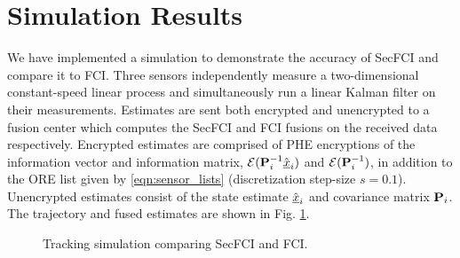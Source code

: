 \documentclass[letterpaper, 10 pt, conference]{ieeeconf}  %
\begin{document}



\section{Simulation Results} \label{sec:results}
We have implemented a simulation to demonstrate the accuracy of SecFCI and compare it to FCI. Three sensors independently measure a two-dimensional constant-speed linear process and simultaneously run a linear Kalman filter on their measurements. Estimates are sent both encrypted and unencrypted to a fusion center which computes the SecFCI and FCI fusions on the received data respectively. Encrypted estimates are comprised of PHE encryptions of the information vector and information matrix, $\mathcal{E}({{\mathbf{P}}}^{-1}_i\hat{{\underline{x}}}_i)$ and $\mathcal{E}({{\mathbf{P}}}^{-1}_i)$, in addition to the ORE list given by \eqref{eqn:sensor_lists} (discretization step-size $s=0.1$). Unencrypted estimates consist of the state estimate $\hat{{\underline{x}}}_i$ and covariance matrix ${{\mathbf{P}}}_i$. The trajectory and fused estimates are shown in Fig. \ref{fig:fci_secfci_traj}.
\begin{figure}[tb]
   \vspace{-5pt}
   \begin{center}
      
   \end{center}
   \vspace{-10pt}
   \caption{Tracking simulation comparing SecFCI and FCI.}
   \label{fig:fci_secfci_traj}
\end{figure}
\end{document}
